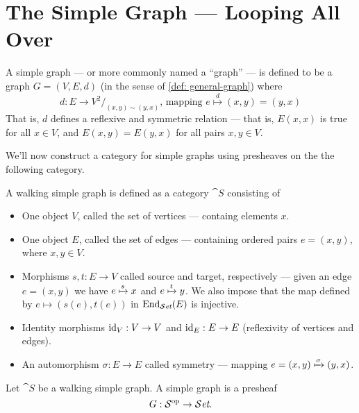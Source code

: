 \section{The Simple Graph --- Looping All Over}

\begin{definition}\label{def: simp-graph}
  A simple graph --- or more commonly named a ``graph'' ---  is defined to be a
  graph \(G = (V, E, d)\) (in the sense of \cref{def: general-graph}) where
  \[
    d: E \to V^2/_{(x, y) \sim (y, x)}
    \text{, mapping }
    e \overset d \longmapsto (x, y) = (y, x)
  \]
  That is, \(d\) defines a reflexive and symmetric relation --- that is, \(E(x,
  x)\) is true for all \(x \in V\), and \(E(x, y) = E(y, x)\) for all pairs \(x,
  y \in V\).
\end{definition}

We'll now construct a category for simple graphs using presheaves on the the
following category.

\begin{definition}\label{def: walking-simp-graph}
  A walking simple graph is defined as a category \(\cat S\) consisting of
  \begin{itemize}
    \setlength\itemsep{0.0em}
    \item One object \(V\), called the set of vertices --- containg elements
      \(x\).
    \item One object \(E\), called the set of edges --- containing ordered pairs
      \(e = (x, y)\), where \(x, y \in V\).
    \item Morphisms \(s, t: E \to V\) called source and target, respectively ---
      given an edge \(e = (x, y)\) we have \(e \xmapsto s x\) and \(e \xmapsto
      t y\). We also impose that the map defined by \(e \mapsto (s(e), t(e))\)
      in \(\operatorname{End}_{{\mathcal{S}\textit{et}}}(E)\) is injective.
    \item Identity morphisms \(\operatorname{id}_V: V \to V\) and \(\operatorname{id}_E: E \to E\)
      (reflexivity of vertices and edges).
    \item An automorphism \(\sigma: E \to E\) called symmetry --- mapping \(e =
      (x, y) \xmapsto\sigma (y, x)\).
  \end{itemize}
\end{definition}

\begin{proposition}\label{prop: simp-graph-presheaf}
  Let \(\cat S\) be a walking simple graph. A simple graph is a presheaf
  \[
    G: \mathcal S^{\mathrm{op}} \to {\mathcal{S}\textit{et}}.
  \]
\end{proposition}

